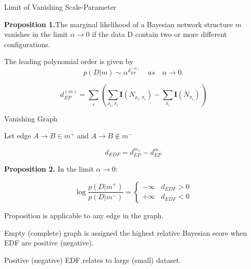 \documentclass{beamer}
\begin{document}
\begin{frame}{Limit of Vanishing Scale-Parameter}
    \begin{tcolorbox}[
    colback=gray!10, colframe=gray!50, arc=5mm,
    boxsep=0.5mm, left=3mm, right=3mm, top=2mm, bottom=2mm
    ]
    \textbf{Proposition 1.}\quad The marginal likelihood of a Bayesian network structure $m$ vanishes in the limit $ \alpha \to 0$ if the data D contain two or more different configurations.
    
    The leading polynomial order is given by
    \begin{equation*}
          p(D|m) \sim \alpha^{d_{EP}^{(m)}} \quad as \quad \alpha \to 0.
    \end{equation*}
    \end{tcolorbox}
    $$d_{EP}^{(m)} = \sum_i\left(\sum_{x_i, \pi_i} \mathbf{I}(N_{x_i, \pi_i}) - \sum_{\pi_i}\mathbf{I}(N_{\pi_i})\right)$$

\end{frame}
\begin{frame}{Vanishing Graph}

    Let edge $A \to B \in m^+$ and $A \to B \notin m^-$

    $$d_{EDF} = d_{EP}^{m_+} - d_{EP}^{m_-}$$

    \begin{tcolorbox}[
    colback=gray!10, colframe=gray!50, arc=5mm,
    boxsep=0.5mm, left=3mm, right=3mm, top=2mm, bottom=2mm
    ]
    \textbf{Proposition 2.} \quad In the limit $\alpha \to 0$:
    
    \begin{equation*}
          \log \frac{p(D | m^+)}{p(D | m^-)} = \begin{cases}
              -\infty & d_{EDF} > 0 \\
              +\infty & d_{EDF} < 0
          \end{cases}
    \end{equation*}
    \end{tcolorbox}
    Proposition is applicable to any edge in the graph.
    
    \bigskip
    
    Empty (complete) graph is assigned the highest relative Bayesian score when EDF are positive (negative).

    Positive (negative) EDF relates to large (small) dataset.

\end{frame}
\end{document}
